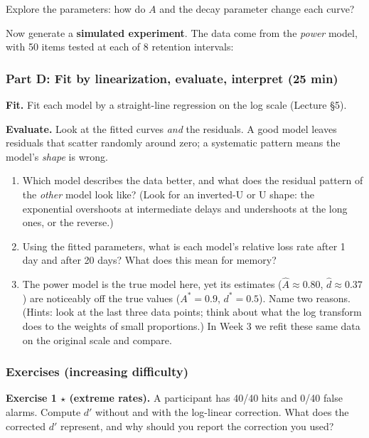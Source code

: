 Explore the parameters: how do \(A\) and the decay parameter change each
curve?

Now generate a \textbf{simulated experiment}. The data come from the
\emph{power} model, with 50 items tested at each of 8 retention
intervals:

\subsubsection{Part D: Fit by linearization, evaluate, interpret (25
min)}

\textbf{Fit.} Fit each model by a straight-line regression on the log
scale (Lecture §5).

\textbf{Evaluate.} Look at the fitted curves \emph{and} the residuals. A
good model leaves residuals that scatter randomly around zero; a
systematic pattern means the model's \emph{shape} is wrong.

\begin{enumerate}
\def\labelenumi{\arabic{enumi}.}
\tightlist
\item
  Which model describes the data better, and what does the residual
  pattern of the \emph{other} model look like? (Look for an inverted-U
  or U shape: the exponential overshoots at intermediate delays and
  undershoots at the long ones, or the reverse.)
\item
  Using the fitted parameters, what is each model's relative loss rate
  after 1 day and after 20 days? What does this mean for memory?
\item
  The power model is the true model here, yet its estimates
  (\(\hat A \approx 0.80\), \(\hat d \approx 0.37\)) are noticeably off
  the true values (\(A^\ast = 0.9\), \(d^\ast = 0.5\)). Name two
  reasons. (Hints: look at the last three data points; think about what
  the log transform does to the weights of small proportions.) In Week 3
  we refit these same data on the original scale and compare.
\end{enumerate}

\subsubsection{Exercises (increasing difficulty)}

\textbf{Exercise 1 \ensuremath{\star} (extreme rates).} A participant has 40/40 hits and
0/40 false alarms. Compute \(d'\) without and with the log-linear
correction. What does the corrected \(d'\) represent, and why should you
report the correction you used?

